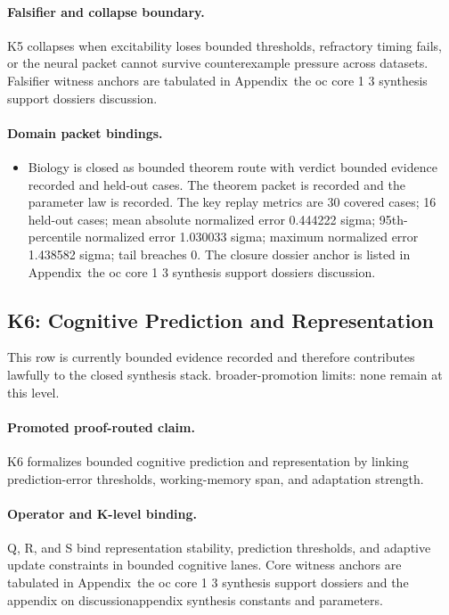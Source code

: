 \paragraph{Falsifier and collapse boundary.}
K5 collapses when excitability loses bounded thresholds, refractory timing fails, or the neural packet cannot survive counterexample pressure across datasets.
Falsifier witness anchors are tabulated in Appendix~the oc core 1 3 synthesis support dossiers discussion.

\paragraph{Domain packet bindings.}
\begin{itemize}[leftmargin=1.6em,nosep]
\item Biology is closed as bounded theorem route with verdict bounded evidence recorded and  held-out cases. The theorem packet is recorded and the parameter law is recorded. The key replay metrics are 30 covered cases; 16 held-out cases; mean absolute normalized error 0.444222 sigma; 95th-percentile normalized error 1.030033 sigma; maximum normalized error 1.438582 sigma; tail breaches 0. The closure dossier anchor is listed in Appendix~the oc core 1 3 synthesis support dossiers discussion.
\end{itemize}

\subsection{K6: Cognitive Prediction and Representation}
\label{sec:oc-core-1-3-synthesis-k6}
This row is currently bounded evidence recorded and therefore contributes lawfully to the closed synthesis stack.
broader-promotion limits: none remain at this level.

\paragraph{Promoted proof-routed claim.}
K6 formalizes bounded cognitive prediction and representation by linking prediction-error thresholds, working-memory span, and adaptation strength.

\paragraph{Operator and K-level binding.}
Q, R, and S bind representation stability, prediction thresholds, and adaptive update constraints in bounded cognitive lanes.
Core witness anchors are tabulated in Appendix~the oc core 1 3 synthesis support dossiers and the appendix on discussionappendix synthesis constants and parameters.

